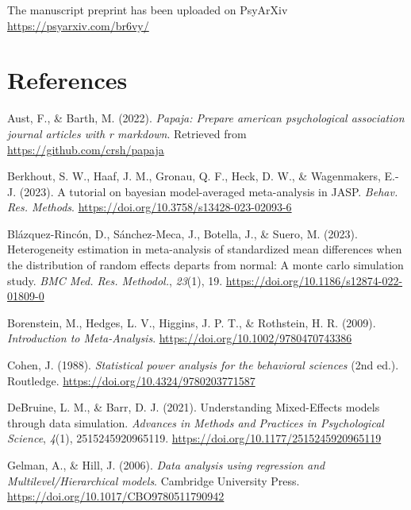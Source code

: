 \documentclass[
  man,floatsintext]{apa6}
\newlength{\cslhangindent}
\newenvironment{CSLReferences}[2] %
 {\begin{list}{}{%
  \setlength{\itemindent}{0pt}
  \setlength{\leftmargin}{0pt}
  \setlength{\parsep}{0pt}
  \ifodd #1
   \setlength{\leftmargin}{\cslhangindent}
   \setlength{\itemindent}{-1\cslhangindent}
  \fi
  \setlength{\itemsep}{#2\baselineskip}}}
 {\end{list}}
\begin{document}
The manuscript preprint has been uploaded on PsyArXiv \url{https://psyarxiv.com/br6vy/}

\newpage

\section*{References}\label{references}

\label{refs}
\begin{CSLReferences}{1}{0}
Aust, F., \& Barth, M. (2022). \emph{Papaja: Prepare american psychological association journal articles with r markdown}. Retrieved from \url{https://github.com/crsh/papaja}

Berkhout, S. W., Haaf, J. M., Gronau, Q. F., Heck, D. W., \& Wagenmakers, E.-J. (2023). A tutorial on bayesian model-averaged meta-analysis in {JASP}. \emph{Behav. Res. Methods}. \url{https://doi.org/10.3758/s13428-023-02093-6}

Blázquez-Rincón, D., Sánchez-Meca, J., Botella, J., \& Suero, M. (2023). Heterogeneity estimation in meta-analysis of standardized mean differences when the distribution of random effects departs from normal: A monte carlo simulation study. \emph{BMC Med. Res. Methodol.}, \emph{23}(1), 19. \url{https://doi.org/10.1186/s12874-022-01809-0}

Borenstein, M., Hedges, L. V., Higgins, J. P. T., \& Rothstein, H. R. (2009). \emph{Introduction to {Meta-Analysis}}. \url{https://doi.org/10.1002/9780470743386}

Cohen, J. (1988). \emph{Statistical power analysis for the behavioral sciences} (2nd ed.). Routledge. \url{https://doi.org/10.4324/9780203771587}

DeBruine, L. M., \& Barr, D. J. (2021). Understanding {Mixed-Effects} models through data simulation. \emph{Advances in Methods and Practices in Psychological Science}, \emph{4}(1), 2515245920965119. \url{https://doi.org/10.1177/2515245920965119}

Gelman, A., \& Hill, J. (2006). \emph{Data analysis using regression and {Multilevel/Hierarchical} models}. Cambridge University Press. \url{https://doi.org/10.1017/CBO9780511790942}


\end{CSLReferences}
\end{document}
